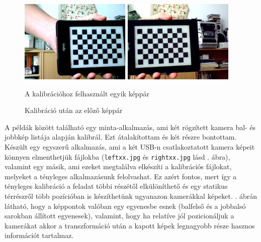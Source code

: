 \documentclass[a4paper,oneside]{article}
\begin{document}
\begin{figure}[tbh]
  \centering
  \includegraphics[width=150pt]{figs/left02.jpg}\hspace{15pt}
  \includegraphics[width=150pt]{figs/right02.jpg}
  \caption{A kalibrációhoz felhasznált egyik képpár \label{fig:imagepairs}}
\end{figure}

\begin{figure}[tbh]
  \centering
  \caption{Kalibráció után az előző képpár \label{fig:calibrated}}
\end{figure}

A példák között található egy minta-alkalmazás, ami két rögzített kamera bal- és jobbkép listája alapján kalibrál. Ezt átalakítottam és két részre bontottam. Készült egy egyszerű alkalmazás, ami a két USB-n csatlakoztatott kamera képeit könnyen elmenthetjük fájlokba (\texttt{leftxx.jpg} és \texttt{rightxx.jpg} lásd . ábra), valamint egy másik, ami ezeket megtalálva elkészíti a kalibrációs fájlokat, melyeket a tényleges alkalmazásunk felolvashat. Ez azért fontos, mert így a tényleges kalibráció a feladat többi részétől elkülöníthető és egy statikus térrészről több pozícióban is készíthetünk ugyanazon kamerákkal képeket. . ábrán látható, hogy a képpontok valóban egy egyenesbe esnek (balfelső és a jobbalsó sarokban állított egyenesek), valamint, hogy ha relatíve jól pozicionáljuk a kamerákat akkor a transzformáció után a kapott képek legnagyobb része hasznos információt tartalmaz.
\end{document}
